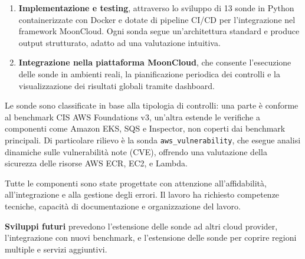 \documentclass[11pt,a4paper]{article}
\begin{document}
\begin{enumerate}
  \item \textbf{Implementazione e testing}, attraverso lo sviluppo di 13 sonde in Python containerizzate con Docker e dotate di pipeline CI/CD per l'integrazione nel framework MoonCloud. Ogni sonda segue un'architettura standard e produce output strutturato, adatto ad una valutazione intuitiva.
  
  \item \textbf{Integrazione nella piattaforma MoonCloud}, che consente l'esecuzione delle sonde in ambienti reali, la pianificazione periodica dei controlli e la visualizzazione dei risultati globali tramite dashboard.
\end{enumerate}

Le sonde sono classificate in base alla tipologia di controlli: una parte è conforme al benchmark CIS AWS Foundations v3, un'altra estende le verifiche a componenti come Amazon EKS, SQS e Inspector, non coperti dai benchmark principali. Di particolare rilievo è la sonda \texttt{aws\_vulnerability}, che esegue analisi dinamiche sulle vulnerabilità note (CVE), offrendo una valutazione della sicurezza delle risorse AWS ECR, EC2, e Lambda. 

Tutte le componenti sono state progettate con attenzione all'affidabilità, all'integrazione e alla gestione degli errori. Il lavoro ha richiesto competenze tecniche, capacità di documentazione e organizzazione del lavoro.

\vspace{1em}

\noindent
\textbf{Sviluppi futuri} prevedono l'estensione delle sonde ad altri cloud provider, l'integrazione con nuovi benchmark, e l'estensione delle sonde per coprire regioni multiple e servizi aggiuntivi.  
\vspace{1em}
\end{document}
